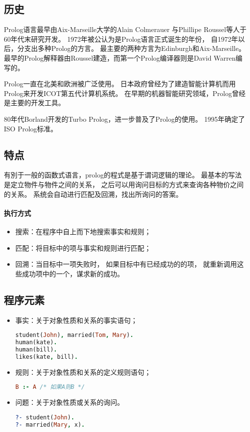 \subsection*{历史}
Prolog语言最早由Aix-Marseille大学的Alain Colmerauer
与Phillipe Roussel等人于60年代末研究开发。
1972年被公认为是Prolog语言正式诞生的年份，
自1972年以后，分支出多种Prolog的方言。
最主要的两种方言为Edinburgh和Aix-Marseille。
最早的Prolog解释器由Roussel建造，而第一个Prolog编译器则是David Warren编写的。

Prolog一直在北美和欧洲被广泛使用。
日本政府曾经为了建造智能计算机而用Prolog来开发ICOT第五代计算机系统。
在早期的机器智能研究领域，Prolog曾经是主要的开发工具。

80年代Borland开发的Turbo Prolog，进一步普及了Prolog的使用。
1995年确定了ISO Prolog标准。

\subsection*{特点}
有別于一般的函数式语言，prolog的程式是基于谓词逻辑的理论。
最基本的写法是定立物件与物件之间的关系，
之后可以用询问目标的方式来查询各种物价之间的关系。
系统会自动进行匹配及回溯，找出所询问的答案。
\paragraph{执行方式}
\begin{itemize}
        \item 搜索：在程序中自上而下地搜索事实和规则；
        \item 匹配：将目标中的项与事实和规则进行匹配；
        \item 回溯：当目标中一项失败时，
                如果目标中有已经成功的的项，
                就重新调用这些成功项中的一个，谋求新的成功。
\end{itemize}

\subsection*{程序元素}
\begin{itemize}
        \item 事实：关于对象性质和关系的事实语句；
                \begin{lstlisting}[language=Prolog]
student(John), married(Tom, Mary).
human(kate).
human(bill).
likes(kate, bill).
                \end{lstlisting}
        \item 规则：关于对象性质和关系的定义规则语句；
                \begin{lstlisting}[language=Prolog]
B :- A /* 如果A则B */
                \end{lstlisting}
        \item 问题：关于对象性质或关系的询问。
                \begin{lstlisting}[language=Prolog]
?- student(John).
?- married(Mary, x).
                \end{lstlisting}
\end{itemize}

